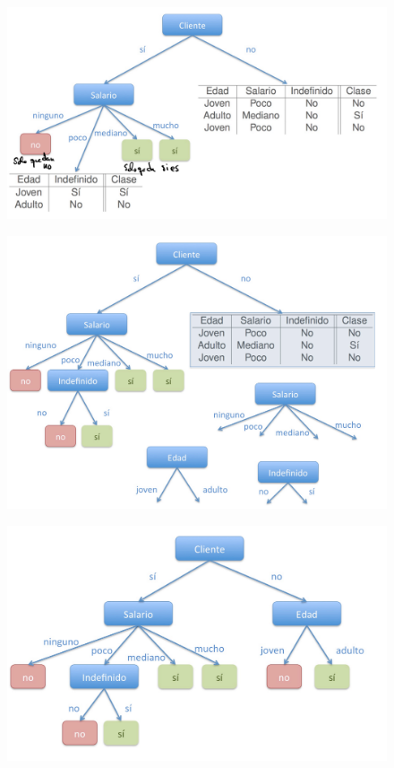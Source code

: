 \documentclass[12pt]{report} %
\begin{document}
\begin{figure}[H]
	{\includegraphics[scale=.2]{Untitled 7.png}}
\end{figure}
\begin{figure}[H]
	{\includegraphics[scale=.2]{Untitled 8.png}}
\end{figure}
\begin{figure}[H]
	{\includegraphics[scale=.2]{Untitled 9.png}}
\end{figure}
\end{document}
